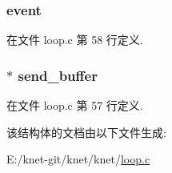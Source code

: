 \subsubsection[{event}]{ event}\label{struct__loop__event__t_a636055ba7fb0edbbec2869e8191614eb}


在文件 loop.\+c 第 58 行定义.

\hypertarget{struct__loop__event__t_a952b3a97af878839c889043391f5bc25}{}
\subsubsection[{send\+\_\+buffer}]{$\ast$ send\+\_\+buffer}\label{struct__loop__event__t_a952b3a97af878839c889043391f5bc25}


在文件 loop.\+c 第 57 行定义.



该结构体的文档由以下文件生成\+:\begin{DoxyCompactItemize}
\item 
E\+:/knet-\/git/knet/knet/\hyperlink{loop_8c}{loop.\+c}\end{DoxyCompactItemize}
